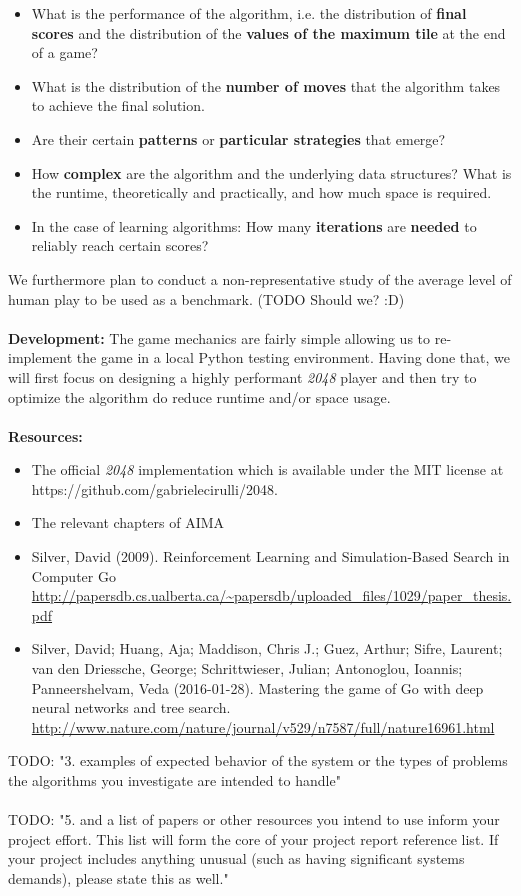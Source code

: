 \documentclass[12pt]{article}
\begin{document}
\begin{itemize}
\itemsep-0.2em
	\item What is the performance of the algorithm, i.e. the distribution of \textbf{final scores} and the distribution of the \textbf{values of the maximum tile} at the end of a game?
	\item What is the distribution of the \textbf{number of moves} that the algorithm takes to achieve the final solution.
	\item Are their certain \textbf{patterns} or \textbf{particular strategies} that emerge? 
	\item How \textbf{complex} are the algorithm and the underlying data structures? What is the runtime, theoretically and practically, and how much space is required.
	\item In the case of learning algorithms: How many \textbf{iterations} are \textbf{needed} to reliably reach certain scores?
\end{itemize}

\noindent We furthermore plan to conduct a non-representative study of the average level of human play to be used as a benchmark. (TODO Should we? :D)
\\\\
\textbf{Development: }The game mechanics are fairly simple allowing us to re-implement the game in a local Python testing environment. Having done that, we will first focus on designing a highly performant \textit{2048} player and then try to optimize the algorithm do reduce runtime and/or space usage.
\\\\
\textbf{Resources: }
\begin{itemize}
	\item The official \textit{2048} implementation which is available under the MIT license at https://github.com/gabrielecirulli/2048.
	\item The relevant chapters of AIMA
	\item Silver, David (2009). Reinforcement Learning and Simulation-Based Search in Computer Go \url{http://papersdb.cs.ualberta.ca/~papersdb/uploaded_files/1029/paper_thesis.pdf}
	\item Silver, David; Huang, Aja; Maddison, Chris J.; Guez, Arthur; Sifre, Laurent; van den Driessche, George; Schrittwieser, Julian; Antonoglou, Ioannis; Panneershelvam, Veda (2016-01-28). Mastering the game of Go with deep neural networks and tree search. \url{http://www.nature.com/nature/journal/v529/n7587/full/nature16961.html}
\end{itemize}
TODO: "3. examples of expected behavior of the system or the types of problems the algorithms you investigate are intended to handle"
\\\\
TODO: "5. and a list of papers or other resources you intend to use inform your project effort. This list will form the core of your project report reference list. If your project includes anything unusual (such as having significant systems demands), please state this as well."
\end{document}
